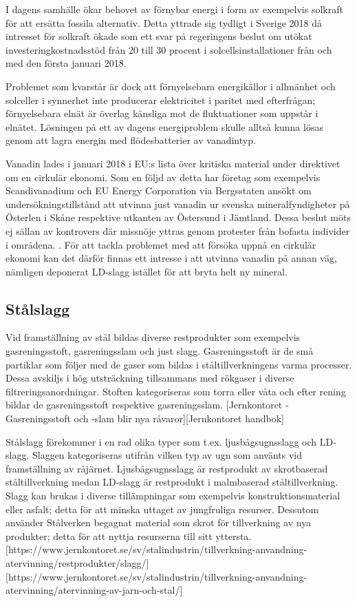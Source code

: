 \documentclass{article}
\begin{document}
I dagens samhälle ökar behovet av förnybar energi i form av exempelvis solkraft för att ersätta fossila alternativ. Detta yttrade sig tydligt i Sverige 2018 då intresset för solkraft ökade som ett svar på regeringens beslut om utökat investeringkostnadsstöd från 20 till 30 procent i solcellsinstallationer från och med den första januari 2018\cite{SverigesEnergimybn2009}.

Problemet som kvarstår är dock att förnyelsebara energikällor i allmänhet och solceller i synnerhet inte producerar elektricitet i paritet med efterfrågan; förnyelsebara elnät är överlag känsliga mot de fluktuationer som uppstår i elnätet. Lösningen på ett av dagens energiproblem skulle alltså kunna lösas genom att lagra energin med flödesbatterier av vanadintyp\cite{Lopez-Vizcaino2017}.


Vanadin lades i januari 2018 i EU:s lista över kritiska material under direktivet om en cirkulär ekonomi\cite{Navigation2018}. 
Som en följd av detta har företag som exempelvis Scandivanadium och EU Energy Corporation via Bergsstaten ansökt om undersökningstillstånd att utvinna just vanadin ur svenska mineralfyndigheter på Österlen i Skåne respektive utkanten av Östersund i Jämtland. Dessa beslut möts ej sällan av kontrovers där missnöje yttras genom protester från bofasta individer i områdena. \cite{NohrstedtLinda2018}. 
För att tackla problemet med att försöka uppnå en cirkulär ekonomi kan det därför finnas ett intresse i att utvinna vanadin på annan väg, nämligen deponerat LD-slagg istället för att bryta helt ny mineral.

\subsection{Stålslagg}
Vid framställning av stål bildas diverse restprodukter som exempelvis gasreningsstoft, gasreningsslam och just slagg. Gasreningsstoft är de små partiklar som följer med de gaser som bildas i ståltillverkningens varma processer. Dessa avskiljs i hög utsträckning tillsammans med rökgaser i diverse filtreringsanordningar. Stoften kategoriseras som torra eller våta och efter rening  bildar de gasreningsstoft respektive gasreningsslam. [Jernkontoret - Gasreningsstoft och -slam blir nya råvaror][Jernkontoret handbok] 

Stålslagg förekommer i en rad olika typer som t.ex. ljusbågsugnsslagg och LD-slagg\cite{Pehlke2014a}. %
Slaggen kategoriseras utifrån vilken typ av ugn som använts vid framställning av råjärnet. Ljusbågsugnsslagg är restprodukt av skrotbaserad ståltillverkning medan LD-slagg är restprodukt i malmbaserad ståltillverkning\cite{Pehlke2014a}. Slagg kan brukas i diverse tillämpningar som exempelvis konstruktionsmaterial eller asfalt; detta för att minska uttaget av jungfruliga resurser. Dessutom använder Stålverken begagnat material som skrot för tillverkning av nya produkter; detta för att nyttja resurserna till sitt yttersta. [https://www.jernkontoret.se/sv/stalindustrin/tillverkning-anvandning-atervinning/restprodukter/slagg/][https://www.jernkontoret.se/sv/stalindustrin/tillverkning-anvandning-atervinning/atervinning-av-jarn-och-stal/] 
\end{document}
